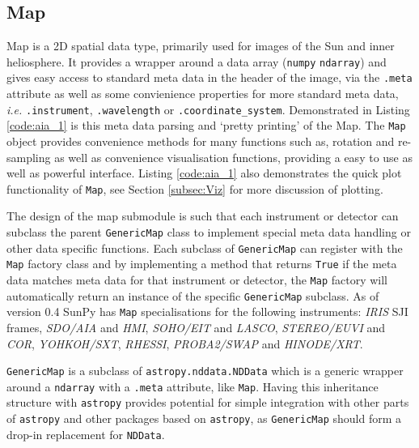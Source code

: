 \subsection{Map}
Map is a 2D spatial data type, primarily used for images of the Sun and 
inner heliosphere. It provides a wrapper around a data array (\texttt{numpy} 
\texttt{ndarray}) and gives easy access to standard meta data in the header of 
the image, via the \texttt{.meta} attribute as well as some convienience 
properties for more standard meta data, \textit{i.e.} \texttt{.instrument}, 
\texttt{.wavelength} or \texttt{.coordinate\_system}. Demonstrated in Listing 
\ref{code:aia_1} is this meta data parsing and `pretty printing' of the Map.
The \texttt{Map} object provides convenience methods for many functions 
such as, rotation and re-sampling as well as convenience visualisation 
functions, providing a easy to use as well as powerful interface.
Listing \ref{code:aia_1} also demonstrates the quick plot functionality of 
\texttt{Map}, see Section \ref{subsec:Viz} for more discussion of plotting.

The design of the map submodule is such that each instrument or 
detector can subclass the parent \texttt{GenericMap} class to implement 
special meta data handling or other data specific functions. Each subclass 
of \texttt{GenericMap} can register with the \texttt{Map} factory class and 
by implementing a method that returns \texttt{True} if the meta data 
matches meta data for that instrument or detector, the \texttt{Map} factory 
will automatically return an instance of the specific \texttt{GenericMap} 
subclass. As of version 0.4 SunPy has \texttt{Map} specialisations for the 
following instruments: \textit{IRIS} SJI frames, \textit{SDO/AIA} and 
\textit{HMI}, \textit{SOHO/EIT} and	\textit{LASCO}, \textit{STEREO/EUVI} and 
\textit{COR}, \textit{YOHKOH/SXT}, \textit{RHESSI}, \textit{PROBA2/SWAP} and 
\textit{HINODE/XRT}.

\texttt{GenericMap} is a subclass of \texttt{astropy.nddata.NDData} which is a 
generic wrapper around a \texttt{ndarray} with a \texttt{.meta} attribute, like 
\texttt{Map}. Having this inheritance structure with \texttt{astropy} provides 
potential for simple integration with other parts of \texttt{astropy} and other 
packages based on \texttt{astropy}, as \texttt{GenericMap} should form a 
drop-in replacement for \texttt{NDData}.


